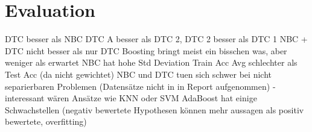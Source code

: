 \chapter{Evaluation}
\label{ch:evaluation}

DTC besser als NBC
DTC A besser als DTC 2, DTC 2 besser als DTC 1
NBC + DTC nicht besser als nur DTC
Boosting bringt meist ein bisschen was, aber weniger als erwartet
NBC hat hohe Std Deviation
Train Acc Avg schlechter als Test Acc (da nicht gewichtet)
NBC und DTC tuen sich schwer bei nicht separierbaren Problemen (Datensätze nicht in in Report aufgenommen) - interessant wären Ansätze wie KNN oder SVM
AdaBoost hat einige Schwachstellen (negativ bewertete Hypothesen können mehr aussagen als positiv bewertete, overfitting)
